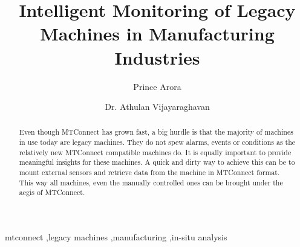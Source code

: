 \documentclass[preprint,authoryear,5p,times,twocolumn]{elsarticle}
\begin{document}
\begin{frontmatter}



\title{Intelligent Monitoring of Legacy Machines in Manufacturing Industries}


\author{Prince Arora}
\address{Indian Institute of Technology Madras, INDIA}

\author{Dr. Athulan Vijayaraghavan}
\address{System Insights Inc.}
\begin{abstract}
Even though MTConnect has grown fast, a big hurdle is that the majority of machines in use today are legacy machines. They do not spew alarms, events or conditions as the relatively new MTConnect compatible machines do. It is equally important to provide meaningful insights for these machines. A quick and dirty way to achieve this can be to mount external sensors and retrieve data from the machine in MTConnect format. This way all machines, even the manually controlled ones can be brought under the aegis of MTConnect.
\end{abstract}

\begin{keyword}
mtconnect \sep legacy machines \sep manufacturing \sep in-situ analysis

\end{keyword}

\end{frontmatter}
\end{document}
